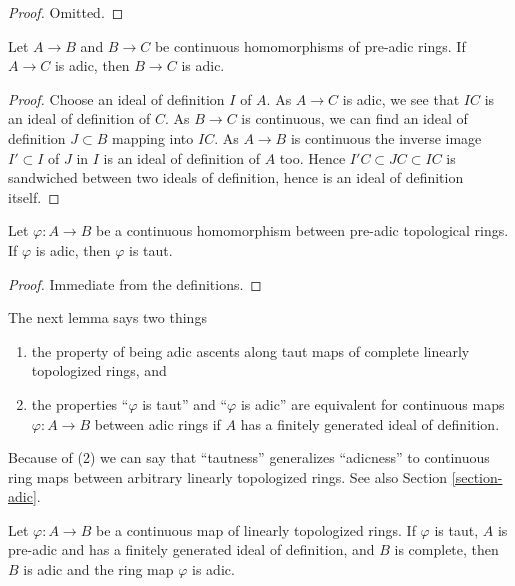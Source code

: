 \begin{proof}
Omitted.
\end{proof}

\begin{lemma}
\label{lemma-permanence-adic}
Let $A \to B$ and $B \to C$ be continuous homomorphisms of
pre-adic rings. If $A \to C$ is adic, then
$B \to C$ is adic.
\end{lemma}

\begin{proof}
Choose an ideal of definition $I$ of $A$. As $A \to C$ is adic, we
see that $IC$ is an ideal of definition of $C$.
As $B \to C$ is continuous, we can find an
ideal of definition $J \subset B$ mapping into $IC$.
As $A \to B$ is continuous the inverse image $I' \subset I$
of $J$ in $I$ is an ideal of definition of $A$ too.
Hence $I'C \subset JC \subset IC$ is sandwiched between
two ideals of definition, hence is an ideal of definition itself.
\end{proof}

\begin{lemma}
\label{lemma-adic-taut}
Let $\varphi : A \to B$ be a continuous homomorphism between
pre-adic topological rings. If $\varphi$ is adic, then $\varphi$ is taut.
\end{lemma}

\begin{proof}
Immediate from the definitions.
\end{proof}

\noindent
The next lemma says two things
\begin{enumerate}
\item the property of being adic ascents along taut maps
of complete linearly topologized rings, and
\item the properties ``$\varphi$ is taut'' and ``$\varphi$ is adic''
are equivalent for continuous maps $\varphi : A \to B$ between adic rings
if $A$ has a finitely generated ideal of definition.
\end{enumerate}
Because of (2) we can say that ``tautness'' generalizes ``adicness''
to continuous ring maps between arbitrary linearly topologized rings.
See also Section \ref{section-adic}.

\begin{lemma}
\label{lemma-taut-is-adic}
Let $\varphi : A \to B$ be a continuous map of linearly topologized rings.
If $\varphi$ is taut, $A$ is pre-adic and has a finitely generated ideal
of definition, and $B$ is complete, then $B$ is adic and the ring map
$\varphi$ is adic.
\end{lemma}

